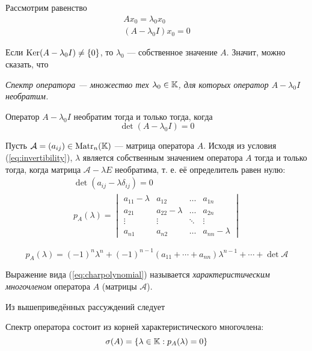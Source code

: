 Рассмотрим равенство
\vspace{-1em}
\[
    \begin{gathered}
        Ax_0 = \lambda_0 x_0 \\
        (A - \lambda_0 I)x_0 = 0 
    \end{gathered}
\]

Если $ \operatorname{Ker} (A - \lambda_0 I) \neq \left\{0\right\} $, то $\lambda_0$ — собственное значение
$A$. Значит, можно сказать, что

\emph{Спектр оператора — множество тех $\lambda_0 \in \mathbb{K}$, для которых оператор
$A - \lambda_0 I$ необратим.}

Оператор $A - \lambda_0 I$ необратим тогда и только тогда, когда 
\begin{equation} \label{eq:invertibility}
    \det (A-\lambda_0 I) = 0 
\end{equation}

Пусть $\mathcal{A} = (a_{ij}) \in \mathrm{Matr}_{n}({\mathbb{K}})$ — матрица оператора $A$. Исходя из
условия (\ref{eq:invertibility}), $\lambda$ является собственным значением
оператора $A$ тогда и только тогда, когда матрица $\mathcal{A} - \lambda E$
необратима, т. е. её определитель равен нулю:
\begin{gather} 
    \det (a_{ij} - \lambda \delta_{ij}) = 0 \nonumber \\[0.5em]
    p_A(\lambda) = \begin{vmatrix}
            a_{11} - \lambda & a_{12} & \ldots & a_{1n} \\
            a_{21} & a_{22} - \lambda & \ldots & a_{2n} \\
            \vdots & \vdots & \ddots & \vdots \\
            a_{n1} & a_{n2} & \ldots & a_{nn} - \lambda
    \end{vmatrix} \label{eq:charpolynomial}
\end{gather}

\begin{equation} \label{eq:charpolynomialexp}
    p_A(\lambda) = (-1)^{n}\lambda^n + (-1)^{n-1} (a_{11} + \dotsb +
    a_{nn}) \lambda^{n-1} + \dotsb + \det \mathcal{A}
\end{equation}

\begin{definition}
    Выражение вида (\ref{eq:charpolynomial}) называется \emph{характеристическим
    многочленом} оператора $A$ (матрицы $\mathcal{A}$).
\end{definition}

Из вышеприведённых рассуждений следует
\begin{theorem} \label{th:charpolynomial}
    Спектр оператора состоит из корней характеристического многочлена:
    \[ \operatorname{\sigma}(A) = \left\{\lambda \in \mathbb{K} : p_A(\lambda) = 0 \right\} \]
\end{theorem}

